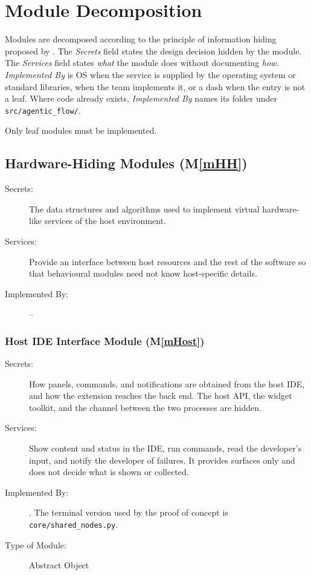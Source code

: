 \documentclass[12pt, titlepage]{article}
\newcommand{\mref}[1]{M\ref{#1}}
\begin{document}
\section{Module Decomposition} \label{SecMD}

Modules are decomposed according to the principle of information hiding proposed
by \citet{ParnasEtAl1984}. The \emph{Secrets} field states the design decision
hidden by the module. The \emph{Services} field states \emph{what} the module
does without documenting \emph{how}. \emph{Implemented By} is OS when the
service is supplied by the operating system or standard libraries,
\progname{} when the team implements it, or a dash when the entry is not a leaf.
Where code already exists, \emph{Implemented By} names its folder under
\texttt{src/agentic\_flow/}.

Only leaf modules must be implemented.

\subsection{Hardware-Hiding Modules (\mref{mHH})}

\begin{description}
\item[Secrets:]The data structures and algorithms used to implement virtual
  hardware-like services of the host environment.
\item[Services:]Provide an interface between host resources and the rest of the
  software so that behavioural modules need not know host-specific details.
\item[Implemented By:] --
\end{description}

\subsubsection{Host IDE Interface Module (\mref{mHost})}

\begin{description}
\item[Secrets:]How panels, commands, and notifications are obtained from the
  host IDE, and how the extension reaches the back end. The host API, the
  widget toolkit, and the channel between the two processes are hidden.
\item[Services:]Show content and status in the IDE, run commands, read the
  developer's input, and notify the developer of failures. It provides
  surfaces only and does not decide what is shown or collected.
\item[Implemented By:] \progname{}. The terminal version used by the proof of
  concept is \texttt{core/shared\_nodes.py}.
\item[Type of Module:] Abstract Object
\end{description}
\end{document}
